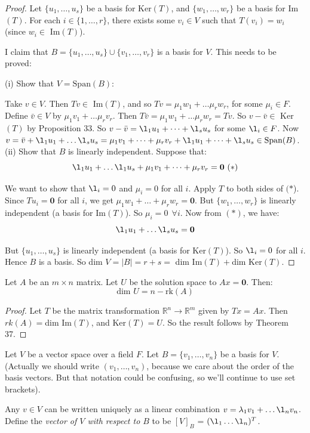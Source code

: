 \documentclass[10pt]{scrartcl}
\begin{document}
\begin{proof}
Let $\{u_1,\dots,u_s\}$ be a basis for Ker$(T)$, and $\{w_1,\dots,w_r\}$ be a basis for Im$(T)$. For each $i \in \{1,\dots,r\}$, there exists some $v_i \in V$ such that $T(v_i) = w_i$ (since $w_i \in $ Im$(T)$).

I claim that $B = \{u_1,\dots,u_s\} \cup \{v_1,\dots,v_r\}$ is a basis for $V$.
This needs to be proved:

(i) Show that $V = \text{Span}(B)$:

Take $v \in V$. Then $Tv \in $ Im$(T)$, and so $Tv = \mu_1w_1 + \dots \mu_rw_r$, for some $\mu_i \in F$. Define $\bar{v} \in V$ by $\mu_1v_1 + \dots \mu_rv_r$. Then $T\bar{v} = \mu_1w_1 + \dots \mu_rw_r = Tv$. So $v - \bar{v} \in $ Ker$(T)$ by Proposition 33. So $v - \bar{v} = \l_1u_1 + \dots + \l_su_s$ for some $\l_i \in F$. Now $v = \bar{v} + \l_1u_1 + \dots \l_su_s = \mu_1v_1 + \dots + \mu_rv_r + \l_1u_1 + \dots + \l_su_s \in \text{Span}(B)$.\\

(ii) Show that $B$ is linearly independent. Suppose that:
 \[\l_1u_1 + \dots \l_1u_s + \mu_1v_1 + \dots + \mu_rv_r = \mathbf{0} ~(*)\]
 
 We want to show that $\l_i = 0$ and $\mu_i = 0$ for all $i$. Apply $T$ to both sides of $(*$). Since $Tu_i = \mathbf{0}$ for all $i$, we get $\mu_1w_1 + \dots + \mu_rw_r = \mathbf{0}$. But $\{w_1,\dots,w_r\}$ is linearly independent (a basis for Im$(T)$). So $\mu_i = 0~~ \forall i$. Now from $(*)$, we have:
\[\l_1u_1 + \dots \l_su_s = \mathbf{0}\]

But $\{u_1,\dots,u_s\}$ is linearly independent (a basis for Ker$(T)$). So $\l_i = 0$ for all $i$. Hence $B$ is a basis. So dim $V = |B| = r + s = $ dim Im$(T) + $dim Ker$(T)$.
\end{proof}\vspace*{5pt}


\begin{corollary} Let $A$ be an $m\times n$ matrix. Let $U$ be the solution space to $Ax = \mathbf{0}$. Then:
\[\text{dim }U = n - \text{rk}(A)\]
\end{corollary}


\begin{proof}
Let $T$ be the matrix transformation $\mathbb{R}^n \to \mathbb{R}^m$ given by $Tx = Ax$. Then $rk(A) = $dim Im$(T)$, and Ker$(T) = U$. So the result follows by Theorem 37.
\end{proof}\vsp

\begin{definition} 
 Let $V$ be a vector space over a field $F.$ Let $B = \{v_1,\dots,v_n\}$ be a basis for $V$. (Actually we should write $(v_1,\dots,v_n)$, because we care about the order of the basis vectors. But that notation could be confusing, so we'll continue to use set brackets).
 
 Any $v \in V$ can be written uniquely as a linear combination $v = \lambda_1v_1 + \dots \l_nv_n$. Define the \emph{vector of $V$ with respect to $B$} to be $[V]_B$ = $(\l_1 \dots \l_n)^T$.
 \end{definition}\vspace*{10pt}
\end{document}
